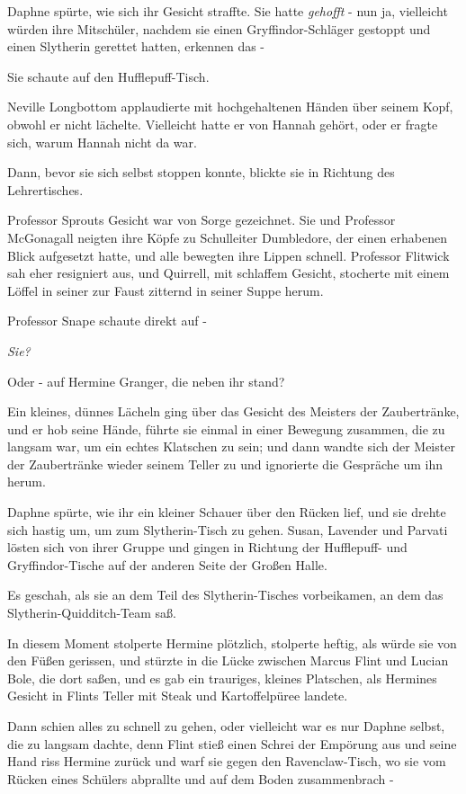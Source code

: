 {Daphne spürte, wie sich ihr Gesicht straffte. Sie hatte \emph{gehofft} - nun ja, vielleicht würden ihre Mitschüler, nachdem sie einen Gryffindor-Schläger gestoppt und einen Slytherin gerettet hatten, erkennen das -

Sie schaute auf den Hufflepuff-Tisch.

Neville Longbottom applaudierte mit hochgehaltenen Händen über seinem Kopf, obwohl er nicht lächelte. Vielleicht hatte er von Hannah gehört, oder er fragte sich, warum Hannah nicht da war.

Dann, bevor sie sich selbst stoppen konnte, blickte sie in Richtung des Lehrertisches.

Professor Sprouts Gesicht war von Sorge gezeichnet. Sie und Professor McGonagall neigten ihre Köpfe zu Schulleiter Dumbledore, der einen erhabenen Blick aufgesetzt hatte, und alle bewegten ihre Lippen schnell. Professor Flitwick sah eher resigniert aus, und Quirrell, mit schlaffem Gesicht, stocherte mit einem Löffel in seiner zur Faust zitternd in seiner Suppe herum.

Professor Snape schaute direkt auf -

\emph{\emph{Sie?}}

Oder - auf Hermine Granger, die neben ihr stand?

Ein kleines, dünnes Lächeln ging über das Gesicht des Meisters der Zaubertränke, und er hob seine Hände, führte sie einmal in einer Bewegung zusammen, die zu langsam war, um ein echtes Klatschen zu sein; und dann wandte sich der Meister der Zaubertränke wieder seinem Teller zu und ignorierte die Gespräche um ihn herum.

Daphne spürte, wie ihr ein kleiner Schauer über den Rücken lief, und sie drehte sich hastig um, um zum Slytherin-Tisch zu gehen. Susan, Lavender und Parvati lösten sich von ihrer Gruppe und gingen in Richtung der Hufflepuff- und Gryffindor-Tische auf der anderen Seite der Großen Halle.

Es geschah, als sie an dem Teil des Slytherin-Tisches vorbeikamen, an dem das Slytherin-Quidditch-Team saß.

In diesem Moment stolperte Hermine plötzlich, stolperte heftig, als würde sie von den Füßen gerissen, und stürzte in die Lücke zwischen Marcus Flint und Lucian Bole, die dort saßen, und es gab ein trauriges, kleines Platschen, als Hermines Gesicht in Flints Teller mit Steak und Kartoffelpüree landete.

Dann schien alles zu schnell zu gehen, oder vielleicht war es nur Daphne selbst, die zu langsam dachte, denn Flint stieß einen Schrei der Empörung aus und seine Hand riss Hermine zurück und warf sie gegen den Ravenclaw-Tisch, wo sie vom Rücken eines Schülers abprallte und auf dem Boden zusammenbrach -

}
